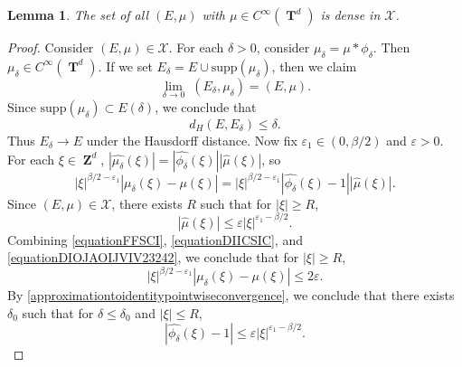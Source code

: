 \documentclass[12pt,reqno]{article}
\numberwithin{equation}{section}
\DeclareMathOperator{\ZZ}{\mathbf{Z}}
\DeclareMathOperator{\TT}{\mathbf{T}}
\newtheorem{lemma}{Lemma}
\begin{document}
\begin{lemma} \label{smoothdensitylemma}
    The set of all $(E,\mu)$ with $\mu \in C^\infty(\TT^d)$ is dense in $\mathcal{X}$.
\end{lemma}
\begin{proof}
    Consider $(E,\mu) \in \mathcal{X}$. For each $\delta > 0$, consider $\mu_\delta = \mu * \phi_\delta$. Then $\mu_\delta \in C^\infty(\TT^d)$. If we set $E_\delta = E \cup \text{supp}(\mu_\delta)$, then we claim
    \begin{equation} \label{equationFFSPCOS}
        \lim_{\delta \to 0}\; (E_\delta, \mu_\delta) = (E,\mu).
    \end{equation}
    Since $\text{supp}(\mu_\delta) \subset E(\delta)$, we conclude that
    \begin{equation} \label{equationFFSICSI}
        d_H(E,E_\delta) \leq \delta.
    \end{equation}
    Thus $E_\delta \to E$ under the Hausdorff distance. Now fix $\varepsilon_1 \in (0,\beta/2)$ and $\varepsilon > 0$. For each $\xi \in \ZZ^d$, $|\widehat{\mu_\delta}(\xi)| = |\widehat{\phi_\delta}(\xi)| |\widehat{\mu}(\xi)|$, so
    \begin{equation} \label{equationFFSCI}
        |\xi|^{\beta/2 - \varepsilon_1} |\mu_\delta(\xi) - \mu(\xi)| = |\xi|^{\beta/2 - \varepsilon_1} |\widehat{\phi_\delta}(\xi) - 1| |\widehat{\mu}(\xi)|.
    \end{equation}
    Since $(E,\mu) \in \mathcal{X}$, there exists $R$ such that for $|\xi| \geq R$,
    \begin{equation} \label{equationDIICSIC}
        |\widehat{\mu}(\xi)| \leq \varepsilon |\xi|^{\varepsilon_1-\beta/2}.
    \end{equation}
    Combining \eqref{equationFFSCI}, \eqref{equationDIICSIC}, and \eqref{equationDIOJAOIJVIV23242}, we conclude that for $|\xi| \geq R$,
    \begin{equation} \label{equationDSCISIIXX}
        |\xi|^{\beta/2 - \varepsilon_1} |\mu_\delta(\xi) - \mu(\xi)| \leq 2 \varepsilon.
    \end{equation}
    By \eqref{approximationtoidentitypointwiseconvergence}, we conclude that there exists $\delta_0$ such that for $\delta \leq \delta_0$ and $|\xi| \leq R$,
    \begin{equation} \label{equationDISCIIS}
        |\widehat{\phi_\delta}(\xi) - 1| \leq \varepsilon |\xi|^{\varepsilon_1 - \beta/2}.
    \end{equation}

\end{proof}
\end{document}
